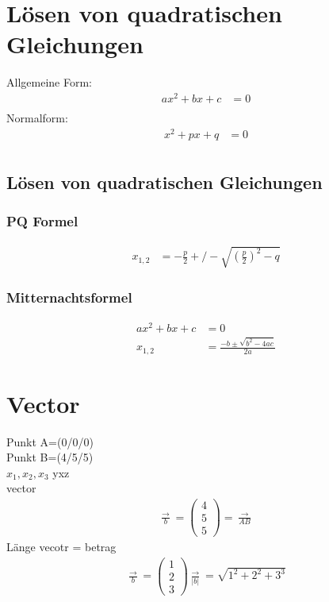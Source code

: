 \section{Lösen von quadratischen Gleichungen}

Allgemeine Form:
\begin{align*}
  ax^2 + bx + c &= 0\\
\end{align*}
Normalform:
\begin{align*}
  x^2 + px + q &= 0\\
\end{align*}
\subsection{Lösen von quadratischen Gleichungen}
\subsubsection{PQ Formel}
\begin{align*}
  x_{1,2} &= -\frac{p}{2} +/- \sqrt{(\frac{p}{2})^2 - q}
\end{align*}
\subsubsection{Mitternachtsformel}
\begin{align*}
  ax^2 + bx + c &= 0\\
  x_{1,2} &= \frac{-b \pm \sqrt{b^2 - 4ac}}
                  {2a}
\end{align*}


\section{Vector}

Punkt A=(0/0/0)\\
Punkt B=(4/5/5)\\

$x_1 ,x_2 ,x_3$ yxz\\
vector\\
\begin{align*}
  \frac{\rightarrow}{b} = \left(
   \begin{array}{c}
     4 \\
     5 \\
     5
   \end{array}
\right)
= \frac{\rightarrow}{AB}
\end{align*}
Länge vecotr = betrag\\
\begin{align*}
  \frac{\rightarrow}{b} = \left(
   \begin{array}{c}
     1 \\
     2 \\
     3
   \end{array}
\right)
\frac{\rightarrow}{|b|} = \sqrt{1^2 +2^2 + 3^3}
\end{align*}

